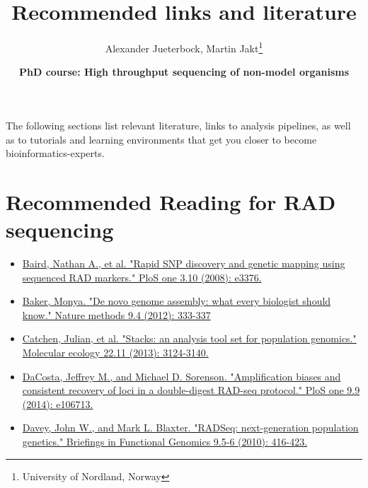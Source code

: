 \documentclass[11pt]{article}
\author{Alexander Jueterbock, Martin Jakt\thanks{University of Nordland, Norway}}
\date{\textbf{PhD course: High throughput sequencing of non-model organisms}}
\title{\textbf{Recommended links and literature}}
\begin{document}
\maketitle








The following sections list relevant literature, links to analysis
pipelines, as well as to tutorials and learning environments that get
you closer to become bioinformatics-experts.

\section{Recommended Reading for RAD sequencing}
\label{sec-1}
\begin{itemize}
\item \href{http://journals.plos.org/plosone/article?id=10.1371/journal.pone.0003376}{Baird, Nathan A., et al. "Rapid SNP discovery and genetic mapping using sequenced RAD markers." PloS one 3.10 (2008): e3376.}
\end{itemize}


\begin{itemize}
\item \href{http://www.nature.com/nmeth/journal/v9/n4/full/nmeth.1935.html}{Baker, Monya. "De novo genome assembly: what every biologist should know." Nature methods 9.4 (2012): 333-337}
\end{itemize}


\begin{itemize}
\item \href{http://onlinelibrary.wiley.com/doi/10.1111/mec.12354/abstract;jsessionid=259B878CB4F4CA43D108D850880842F7.f02t03?deniedAccessCustomisedMessage=&userIsAuthenticated=false}{Catchen, Julian, et al. "Stacks: an analysis tool set for population genomics." Molecular ecology 22.11 (2013): 3124-3140.}
\end{itemize}


\begin{itemize}
\item \href{http://journals.plos.org/plosone/article?id=10.1371/journal.pone.0106713}{DaCosta, Jeffrey M., and Michael D. Sorenson. "Amplification biases and consistent recovery of loci in a double-digest RAD-seq protocol." PloS one 9.9 (2014): e106713.}
\end{itemize}


\begin{itemize}
\item \href{http://bfg.oxfordjournals.org/content/9/5-6/416.short}{Davey, John W., and Mark L. Blaxter. "RADSeq: next-generation population genetics." Briefings in Functional Genomics 9.5-6 (2010): 416-423.}
\end{itemize}
\end{document}
